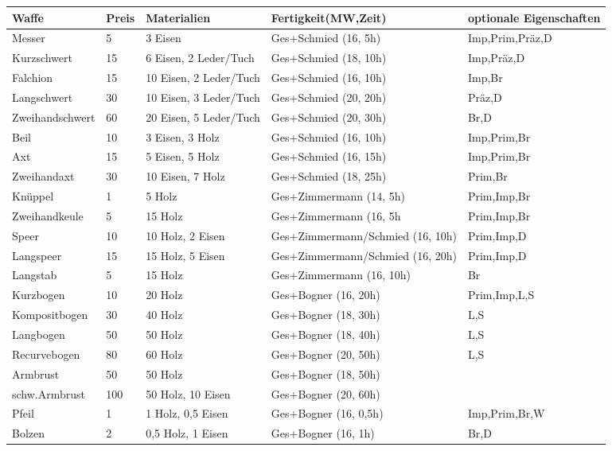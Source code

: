 \documentclass{article}
\begin{document}
\begin{small}
\begin{tabular}{|m{25mm}|m{1cm}|m{40mm}|m{40mm}|m{30mm}|}
\hline
\textbf{Waffe}&\textbf{Preis}&\textbf{Materialien}&\textbf{Fertigkeit(MW,Zeit)}&\textbf{optionale Eigenschaften}\\
\hline
\hline
Messer&5&3 Eisen&Ges+Schmied (16, 5h)&Imp,Prim,Präz,D\\
\hline
Kurzschwert&15&6 Eisen, 2 Leder/Tuch&Ges+Schmied (18, 10h)&Imp,Präz,D\\
\hline
Falchion&15&10 Eisen, 2 Leder/Tuch&Ges+Schmied (16, 10h)&Imp,Br\\
\hline
Langschwert&30&10 Eisen, 3 Leder/Tuch&Ges+Schmied (20, 20h)&Präz,D\\
\hline
Zweihandschwert&60&20 Eisen, 5 Leder/Tuch&Ges+Schmied (20, 30h)&Br,D\\
\hline
Beil&10&3 Eisen, 3 Holz&Ges+Schmied (16, 10h)&Imp,Prim,Br\\
\hline
Axt&15&5 Eisen, 5 Holz&Ges+Schmied (16, 15h)&Imp,Prim,Br\\
\hline
Zweihandaxt&30&10 Eisen, 7 Holz&Ges+Schmied (18, 25h)&Prim,Br\\
\hline
Knüppel&1&5 Holz&Ges+Zimmermann (14, 5h)&Prim,Imp,Br\\
\hline
Zweihandkeule&5&15 Holz&Ges+Zimmermann (16, 5h&Prim,Imp,Br\\
\hline
Speer&10&10 Holz, 2 Eisen&Ges+Zimmermann/Schmied (16, 10h)&Prim,Imp,D\\
\hline
Langspeer&15&15 Holz, 5 Eisen&Ges+Zimmermann/Schmied (16, 20h)&Prim,Imp,D\\
\hline
Langstab&5&15 Holz&Ges+Zimmermann (16, 10h)&Br\\
\hline
Kurzbogen&10&20 Holz&Ges+Bogner (16, 20h)&Prim,Imp,L,S\\
\hline
Kompositbogen&30&40 Holz&Ges+Bogner (18, 30h)&L,S\\
\hline
Langbogen&50&50 Holz&Ges+Bogner (18, 40h)&L,S\\
\hline
Recurvebogen&80&60 Holz&Ges+Bogner (20, 50h)&L,S\\
\hline
Armbrust&50&50 Holz&Ges+Bogner (18, 50h)&\\
\hline
schw.Armbrust&100&50 Holz, 10 Eisen&Ges+Bogner (20, 60h)&\\
\hline
Pfeil&1&1 Holz, 0,5 Eisen&Ges+Bogner (16, 0,5h)&Imp,Prim,Br,W\\
\hline
Bolzen&2&0,5 Holz, 1 Eisen&Ges+Bogner (16, 1h)&Br,D\\
\hline
\end{tabular}
\end{small}
\end{document}
